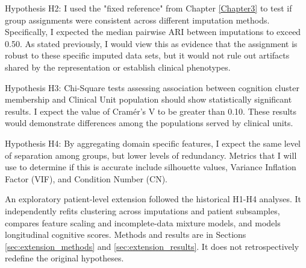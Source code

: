 Hypothesis H2: I used the "fixed reference" from Chapter \ref{Chapter3} to test if group assignments were consistent across different imputation methods. Specifically, I expected the median pairwise ARI between imputations to exceed 0.50. As stated previously, I would view this as evidence that the assignment is robust to these specific imputed data sets, but it would not rule out artifacts shared by the representation or establish clinical phenotypes.

Hypothesis H3: Chi-Square tests assessing association between cognition cluster membership and Clinical Unit population should show statistically significant results. I expect the value of Cramér's V to be greater than 0.10. These results would demonstrate differences among the populations served by clinical units.

Hypothesis H4: By aggregating domain specific features, I expect the same level of separation among groups, but lower levels of redundancy. Metrics that I will use to determine if this is accurate include silhouette values, Variance Inflation Factor (VIF), and Condition Number (CN).

An exploratory patient-level extension followed the historical H1-H4 analyses. It independently refits clustering across imputations and patient subsamples, compares feature scaling and incomplete-data mixture models, and models longitudinal cognitive scores. Methods and results are in Sections \ref{sec:extension_methods} and \ref{sec:extension_results}. It does not retrospectively redefine the original hypotheses.

